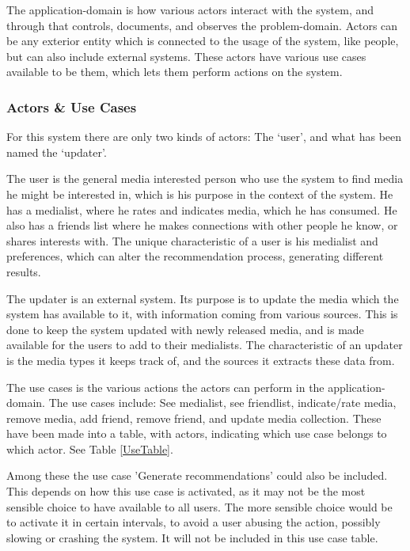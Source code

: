 The application-domain is how various actors interact with the system, and through that controls, documents, and observes the problem-domain. Actors can be any exterior entity which is connected to the usage of the system, like people, but can also include external systems. These actors have various use cases available to be them, which lets them perform actions on the system.

\subsubsection{Actors \& Use Cases}

For this system there are only two kinds of actors: The ‘user’, and what has been named the ‘updater’.

The user is the general media interested person who use the system to find media he might be interested in, which is his purpose in the context of the system. He has a medialist, where he rates and indicates media, which he has consumed. He also has a friends list where he makes connections with other people he know, or shares interests with. The unique characteristic of a user is his medialist and preferences, which can alter the recommendation process, generating different results.

The updater is an external system. Its purpose is to update the media which the system has available to it, with information coming from various sources. This is done to keep the system updated with newly released media, and is made available for the users to add to their medialists. The characteristic of an updater is the media types it keeps track of, and the sources it extracts these data from.

The use cases is the various actions the actors can perform in the application-domain. The use cases include: See medialist, see friendlist, indicate/rate media, remove media, add friend, remove friend, and update media collection. These have been made into a table, with actors, indicating which use case belongs to which actor. See Table \ref{UseTable}.

Among these the use case 'Generate recommendations' could also be included. This depends on how this use case is activated, as it may not be the most sensible choice to have available to all users. The more sensible choice would be to activate it in certain intervals, to avoid a user abusing the action, possibly slowing or crashing the system. It will not be included in this use case table.


